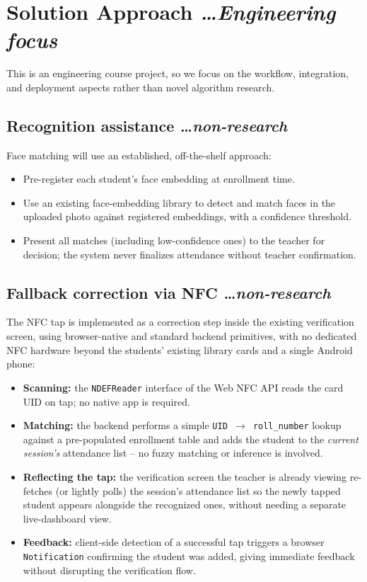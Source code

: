 \documentclass[11pt,a4paper]{article}
\newcommand{\BvrHint}[1]{%
  {\normalfont\normalsize\itshape\hfill #1}}
\begin{document}
\section{Solution Approach %
\BvrHint{\ldots Engineering focus}}
This is an engineering course project, so we focus on the workflow,
integration, and deployment aspects rather than novel algorithm
research.

\subsection{Recognition assistance %
\BvrHint{\ldots non-research}}
Face matching will use an established, off-the-shelf approach:
\begin{itemize}[leftmargin=0.7cm]
    \item Pre-register each student's face embedding at enrollment time.
    \item Use an existing face-embedding library to detect and match faces in the uploaded photo against registered embeddings, with a confidence threshold.
    \item Present all matches (including low-confidence ones) to the teacher for decision; the system never finalizes attendance without teacher confirmation.
\end{itemize}

\subsection{Fallback correction via NFC %
\BvrHint{\ldots non-research}}
The NFC tap is implemented as a correction step inside the existing
verification screen, using browser-native and standard backend
primitives, with no dedicated NFC hardware beyond the students'
existing library cards and a single Android phone:
\begin{itemize}[leftmargin=0.7cm]
    \item \textbf{Scanning:} the \texttt{NDEFReader} interface of the Web NFC API reads the card UID on tap; no native app is required.
    \item \textbf{Matching:} the backend performs a simple \texttt{UID $\rightarrow$ roll\_number} lookup against a pre-populated enrollment table and adds the student to the \emph{current session's} attendance list -- no fuzzy matching or inference is involved.
    \item \textbf{Reflecting the tap:} the verification screen the teacher is already viewing re-fetches (or lightly polls) the session's attendance list so the newly tapped student appears alongside the recognized ones, without needing a separate live-dashboard view.
    \item \textbf{Feedback:} client-side detection of a successful tap triggers a browser \texttt{Notification} confirming the student was added, giving immediate feedback without disrupting the verification flow.
\end{itemize}
\end{document}
